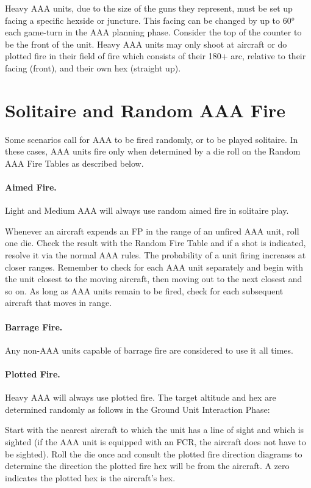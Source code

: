 \begin{advancedrules}
Heavy AAA units, due to the size of the guns they represent, must be set up facing a specific hexside or juncture. This facing can be changed by up to 60° each game-turn in the AAA planning phase. Consider the top of the counter to be the front of the unit. Heavy AAA units may only shoot at aircraft or do plotted fire in their field of fire which consists of their 180+ arc, relative to their facing (front), and their own hex (straight up).

\section{Solitaire and Random AAA Fire}

Some scenarios call for AAA to be fired randomly, or to be played solitaire. In these cases, AAA units fire only when determined by a die roll on the Random AAA Fire Tables as described below.

\paragraph{Aimed Fire.} Light and Medium AAA will always use random aimed fire in solitaire play.

Whenever an aircraft expends an FP in the range of an unfired AAA unit, roll one die. Check the result with the Random Fire Table and if a shot is indicated, resolve it via the normal AAA rules. The probability of a unit firing increases at closer ranges. Remember to check for each AAA unit separately and begin with the unit closest to the moving aircraft, then moving out to the next closest and so on. As long as AAA units remain to be fired, check for each subsequent aircraft that moves in range.

\paragraph{Barrage Fire.} Any non-AAA units capable of barrage fire are considered to use it all times.

\paragraph{Plotted Fire.} Heavy AAA will always use plotted fire. The target altitude and hex are determined randomly as follows in the Ground Unit Interaction Phase:

Start with the nearest aircraft to which the unit has a line of sight and which is sighted (if the AAA unit is equipped with an FCR, the aircraft does not have to be sighted). Roll the die once and consult the plotted fire direction diagrams to determine the direction the plotted fire hex will be from the aircraft. A zero indicates the plotted hex is the aircraft's hex.


\end{advancedrules}

